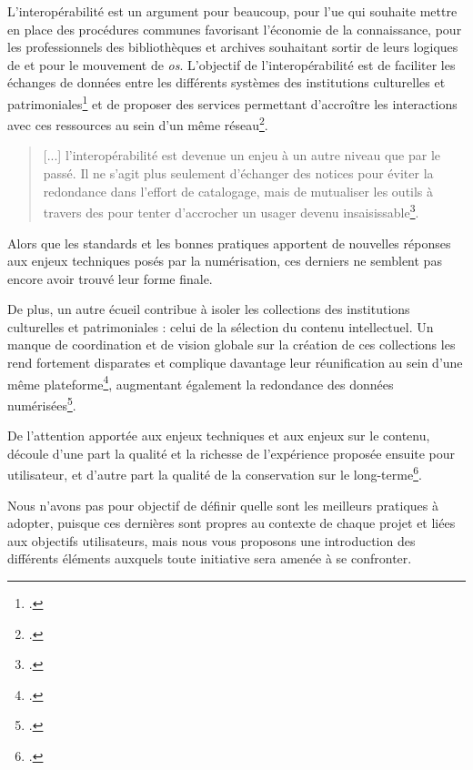 L'interopérabilité est un argument pour beaucoup, pour l'\gls{ue} qui souhaite mettre en place des procédures communes favorisant l'économie de la connaissance, pour les professionnels des bibliothèques et archives souhaitant sortir de leurs logiques de  et pour le mouvement de \textit{\gls{os}}. L'objectif de l'interopérabilité est de faciliter les échanges de données entre les différents systèmes des institutions culturelles et patrimoniales\footcite{lopatin_library_2006} et de proposer des services permettant d'accroître les interactions avec ces ressources au sein d'un même réseau\footcite{xie_discover_2016}.

\begin{quotation}
[...] l'interopérabilité est devenue un enjeu à un autre niveau que par le passé. Il ne s'agit plus seulement d'échanger des notices pour éviter la redondance dans l'effort de catalogage, mais de mutualiser les outils à travers des  pour tenter d'accrocher un usager devenu insaisissable\footcite[p.21]{bermes_web_2013}.
\end{quotation}

Alors que les standards et les bonnes pratiques apportent de nouvelles réponses aux enjeux techniques posés par la numérisation, ces derniers ne semblent pas encore avoir trouvé leur forme finale. 

De plus, un autre écueil contribue à isoler les collections des institutions culturelles et patrimoniales : celui de la sélection du contenu intellectuel. Un manque de coordination et de vision globale sur la création de ces collections les rend fortement disparates et complique davantage leur réunification au sein d'une même plateforme\footcite{coutts_stepping_2017}, augmentant également la redondance des données numérisées\footcite{institut_national_dhistoire_de_lart_lundisnum_nodate}. 

De l'attention apportée aux enjeux  techniques et aux enjeux sur le contenu, découle d'une part la qualité et la richesse de l'expérience proposée ensuite pour utilisateur, et d'autre part la qualité de la conservation sur le long-terme\footcite{xie_discover_2016}. 

Nous n'avons pas pour objectif de définir quelle sont les meilleurs pratiques à adopter, puisque ces dernières sont propres au contexte de chaque projet et liées aux objectifs utilisateurs, mais nous vous proposons une introduction des différents éléments auxquels toute initiative sera amenée à se confronter.

